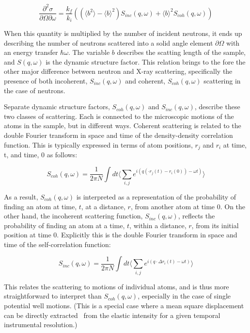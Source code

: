 \documentclass[8.5pt,twoside,twocolumn]{article}
\begin{document}
\begin{equation}
\label{eq:Jon1}
\frac{\partial ^2 \sigma}{\partial \Omega \partial \omega} = \frac{k_f}{k_i} \left((\langle b^2 \rangle - \langle b \rangle ^2) S_{inc}(q,\omega) + \langle b \rangle ^2 S_{coh}(q,\omega) \right)  
\end{equation}


When this quantity is multiplied by the number of incident neutrons, it ends up describing  the number of neutrons scattered into a solid angle element $\partial\Omega$ with an energy transfer $\hbar\omega$. The variable $b$ describes the scatting length of the sample, and $S(q,\omega)$ is the dynamic structure factor. This relation brings to the fore the other major difference between neutron and X-ray scattering, specifically the presence of both incoherent, $S_{inc}(q,\omega)$ and coherent, $S_{coh}(q,\omega)$ scattering in the case of neutrons. 

Separate dynamic structure factors, $S_{coh}(q,\omega)$ and $S_{inc}(q,\omega)$, describe these two classes of scattering. Each is connected to the microscopic motions of the atoms in the sample, but in different ways. Coherent scattering is related to the double Fourier transform in space and time of the density-density correlation function.  This is typically expressed in terms of atom positions, $r_j$ and $r_i$ at time, t, and time, 0 as follows:

\begin{equation}
\label{eq:Jon2}
S_{coh}(q,\omega)=\frac{1}{2\pi N}\int dt \langle \sum_{i,j} e^{i(q\left(\cdot r_j(t)-r_i(0) \right)-\omega t)}\rangle
\end{equation}

As a result, $S_{coh}(q,\omega)$ is interpreted as a representation of the probability of finding an atom at time, $t$, at a distance, $r$, from another atom at time 0. On the other hand, the incoherent scattering function, $S_{inc}(q,\omega)$, reflects the probability of finding an atom at a time, $t$, within a distance, $r$, from its initial position at time 0. Explicitly this is the double Fourier transform in space and time of the self-correlation function: 

\begin{equation}
\label{eq:Jon3}
S_{inc}(q,\omega)=\frac{1}{2\pi N}\int dt \langle \sum_{i,j} e^{i(q \cdot \Delta r_i(t) -\omega t)}\rangle
\end{equation}


This relates the scattering to motions of individual atoms, and is thus more straightforward to interpret than $S_{coh}(q,\omega)$, especially in the case of single potential well motions. (This is a special case where a mean square displacement can be directly extracted~\cite{Zaccai.2000} from the elastic intensity for a given temporal instrumental resolution.)  
\end{document}
